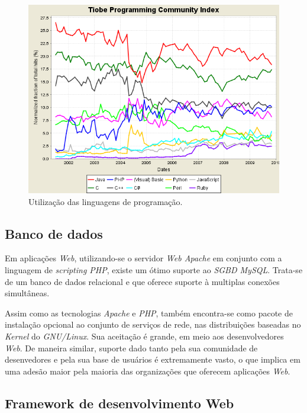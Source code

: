 \clearpage
\begin{figure}[h!tp]
    \begin{center}
        \includegraphics[scale=0.7]{./figuras/tpci_trends.png}

        \caption{Utilização das linguagens de programação. \cite{Languages}}
    \end{center}
\end{figure}

\subsection{Banco de dados}

Em aplicações \textit{Web}, utilizando-se o servidor \textit{Web Apache} em conjunto com a linguagem de \textit{scripting PHP}, existe um ótimo suporte ao \textit{SGBD MySQL}. Trata-se de um banco de dados relacional e que oferece suporte à multiplas conexões simultâneas.

Assim como as tecnologias \textit{Apache} e \textit{PHP}, também encontra-se como pacote de instalação opcional ao conjunto de serviços de rede, nas distribuições baseadas no \textit{Kernel} do \textit{GNU/Linux}. Sua aceitação é grande, em meio aos desenvolvedores \textit{Web}. De maneira similar, suporte dado tanto pela sua comunidade de desenvedores e pela sua base de usuários é extremamente vasto, o que implica em uma adesão maior pela maioria das organizações que oferecem aplicações \textit{Web}.

\subsection{Framework de desenvolvimento Web}

